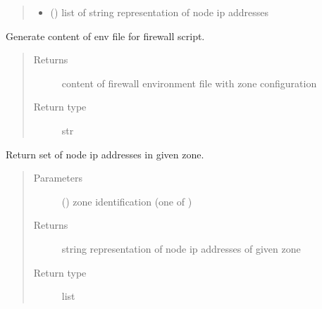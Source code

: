 \documentclass[letterpaper,10pt,english]{sphinxmanual}
\begin{document}
\begin{fulllineitems}
\begin{fulllineitems}
\begin{quote}
\begin{description}
\begin{itemize}
\item {} 
 () \textendash{} list of string representation of node ip addresses

\end{itemize}

\end{description}\end{quote}

\end{fulllineitems}


\begin{fulllineitems}
\label{\detokenize{ocpnetsplit:ocpnetsplit.zone.ZoneConfig.get_env_file}}
Generate content of env file for firewall script.
\begin{quote}\begin{description}
\item[{Returns}] \leavevmode
content of firewall environment file with zone configuration

\item[{Return type}] \leavevmode
str

\end{description}\end{quote}

\end{fulllineitems}


\begin{fulllineitems}
\label{\detokenize{ocpnetsplit:ocpnetsplit.zone.ZoneConfig.get_nodes}}
Return set of node ip addresses in given zone.
\begin{quote}\begin{description}
\item[{Parameters}] \leavevmode
{} () \textendash{} zone identification (one of )

\item[{Returns}] \leavevmode
string representation of node ip addresses of given zone

\item[{Return type}] \leavevmode
list

\end{description}\end{quote}

\end{fulllineitems}


\end{fulllineitems}
\end{document}
